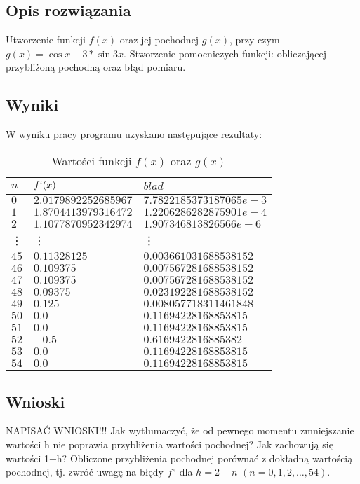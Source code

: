 \documentclass{classrep}
\begin{document}
	\subsection{Opis rozwiązania}
		Utworzenie funkcji $f(x)$ oraz jej pochodnej $g(x)$, przy czym $g(x)=\cos{x}-3*\sin{3x}$. Stworzenie 
		pomocniczych funkcji: obliczającej przybliżoną pochodną oraz błąd pomiaru.
	\subsection{Wyniki}
		W wyniku pracy programu uzyskano następujące rezultaty:
		
		\begin{table}[h!]
        	\centering
        	\footnotesize
			\begin{tabular}{lll} \toprule
				$n$ & $f`(x)$ & $blad$ \\ \midrule
				$0$ & $2.0179892252685967$ & $7.7822185373187065e-3$ \\ 
 				$1$ & $1.8704413979316472$ & $1.2206286282875901e-4$ \\
 				$2$ & $1.1077870952342974$ & $1.907346813826566e-6$ \\
 				\vdots & \vdots & \vdots \\
 				$45$ & $0.11328125$ & $0.003661031688538152$ \\
 				$46$ & $0.109375$ & $0.007567281688538152$ \\
 				$47$ & $0.109375$ & $0.007567281688538152$ \\
 				$48$ & $0.09375$ & $0.023192281688538152$ \\
 				$49$ & $0.125$ & $0.008057718311461848$ \\
 				$50$ & $0.0$ & $0.11694228168853815$ \\
 				$51$ & $0.0$ & $0.11694228168853815$ \\
 				$52$ & $-0.5$ & $0.6169422816885382$ \\
 				$53$ & $0.0$ & $0.11694228168853815$ \\
 				$54$ & $0.0$ & $0.11694228168853815$ \\\bottomrule
 			\end{tabular}
 			\caption{Wartości funkcji $f(x)$ oraz $g(x)$}
			\label{table:11}
		\end{table}		
		
	\subsection{Wnioski}
	NAPISAĆ WNIOSKI!!!
		Jak wytłumaczyć, że od pewnego momentu zmniejszanie wartości h nie poprawia przybliżenia
wartości pochodnej? Jak zachowują się wartości 1+h? Obliczone przybliżenia pochodnej
porównać z dokładną wartością pochodnej, tj. zwróć uwagę na błędy $f`$ dla $h=2-n$ $(n=0,1,2,\dots,54)$.
\end{document}

